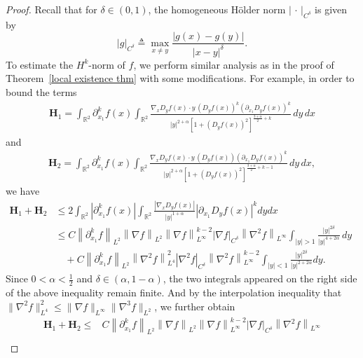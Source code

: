 \documentclass[reqno]{amsart}%
\theoremstyle{definition}
\theoremstyle{remark}
\numberwithin{equation}{section}
\newcommand{\0}{\mathbf{0}}
\newcommand{\1}{\mathbf{1}}
\numberwithin{equation}{section}
\numberwithin{theorem}{section}
\numberwithin{figure}{section}
\begin{document}
\begin{proof}
Recall that for $\delta\in(0,1)$, the homogeneous H\"{o}lder norm $\left|\,\cdot\,\right|_{C^{\delta}}$ is given by
 \begin{equation*}
\left|g\right|_{C^{\delta}} \triangleq \max_{x \neq y} \frac{|g(x) - g(y)|}{|x - y|^\delta}.
 \end{equation*}
To estimate the $H^k$-norm of $f$, we perform similar analysis as in the proof of Theorem~\ref{local existence thm} with some modifications. For example, in order to bound the terms
\begin{align*}
\mathbf{H}_{1} = \int_{\mathbb{R}^2} \partial_{x_1}^k f(x) \int_{\mathbb{R}^2} \frac{\nabla_{x} D_{y} f(x) \cdot y \, ( D_{y} f(x))^k (\partial_{x_1} D_{y} f(x))^k}{|y|^{2+\alpha} \left[ 1 + (D_{y} f(x))^2 \right]^{\frac{3+\alpha}{2}+k}} \, dy \, dx
\end{align*}
and
\begin{align*}
\mathbf{H}_{2} = \int_{\mathbb{R}^2} \partial_{x_1}^k f(x) \int_{\mathbb{R}^2} \frac{\nabla_{x} D_{y} f(x) \cdot y \, (  D_{y} f(x)) (\partial_{x_1} D_{y} f(x))^k}{|y|^{2+\alpha} \left[ 1 + (D_{y} f(x))^2 \right]^{\frac{3+\alpha}{2}+k-1}} \, dy \, dx,
\end{align*}
we have
\begin{align*}
\mathbf{H}_{1} + \mathbf{H}_{2} &\le 2 \int_{\mathbb{R}^2} |\partial_{x_1}^k f(x)| \int_{\mathbb{R}^2} \frac{|\nabla_x D_y f(x)|}{|y|^{1+\alpha}} \left|\partial_{x_1} D_y f(x)\right|^k dydx\\
&\leq C\left\|\partial_{x_1}^k f\right\|_{L^2}\left\|\nabla f\right\|_{L^2} \left\|\nabla f \right\|^{k-2}_{L^{\infty}}\left|\nabla f\right|_{C^{\delta}} \left\|\nabla^2 f\right\|_{L^{\infty}} \int_{|y|>1} \frac{|y|^{2\delta}}{|y|^{4+2\alpha}} \, dy \quad \\
&\quad + C\left\|\partial_{x_1}^k f\right\|_{L^2}\left\|\nabla^2 f\right\|_{L^4}^2\left|\nabla^2 f\right|_{C^{\delta}} \left\|\nabla^2 f\right\|^{k-2}_{L^{\infty}}\int_{|y|<1} \frac{|y|^{2\delta}}{|y|^{2+2\alpha}}dy.
\end{align*}
Since $0 < \alpha < \frac{1}{2}$ and $\delta\in(\alpha,1-\alpha)$, the two integrals appeared on the right side of the above inequality remain finite. And by the interpolation inequality that $\|\nabla^2 f\|_{L^4}^2\le \|\nabla f\|_{L^\infty}\|\nabla^3 f\|_{L^2}$, we further obtain
\begin{align*}
\mathbf{H}_{1} + \mathbf{H}_{2}\le &C\left\|\partial_{x_1}^k f\right\|_{L^2}\left\|\nabla f\right\|_{L^2} \left\|\nabla f \right\|^{k-2}_{L^{\infty}}\left|\nabla f\right|_{C^{\delta}} \left\|\nabla^2 f\right\|_{L^{\infty}}\\

\end{align*}
\end{proof}
\end{document}
